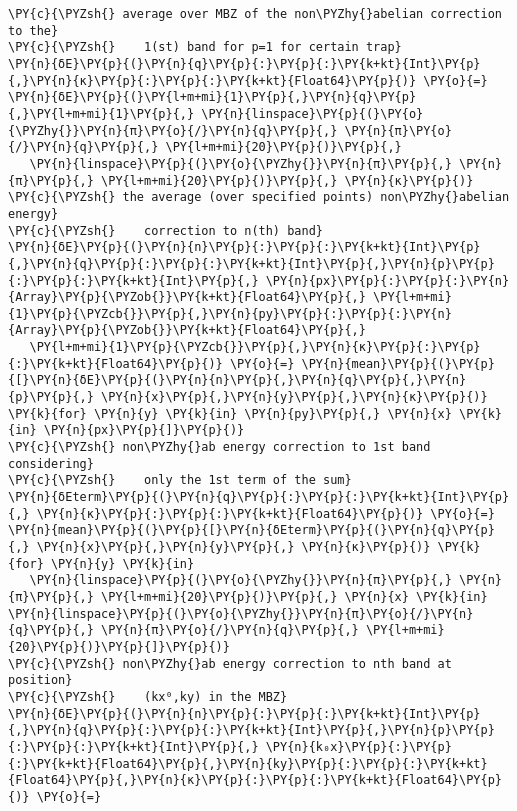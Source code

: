 \begin{Verbatim}[commandchars=\\\{\}]
\PY{c}{\PYZsh{} average over MBZ of the non\PYZhy{}abelian correction to the}
\PY{c}{\PYZsh{}    1(st) band for p=1 for certain trap}
\PY{n}{δE}\PY{p}{(}\PY{n}{q}\PY{p}{:}\PY{p}{:}\PY{k+kt}{Int}\PY{p}{,}\PY{n}{κ}\PY{p}{:}\PY{p}{:}\PY{k+kt}{Float64}\PY{p}{)} \PY{o}{=} \PY{n}{δE}\PY{p}{(}\PY{l+m+mi}{1}\PY{p}{,}\PY{n}{q}\PY{p}{,}\PY{l+m+mi}{1}\PY{p}{,} \PY{n}{linspace}\PY{p}{(}\PY{o}{\PYZhy{}}\PY{n}{π}\PY{o}{/}\PY{n}{q}\PY{p}{,} \PY{n}{π}\PY{o}{/}\PY{n}{q}\PY{p}{,} \PY{l+m+mi}{20}\PY{p}{)}\PY{p}{,}
   \PY{n}{linspace}\PY{p}{(}\PY{o}{\PYZhy{}}\PY{n}{π}\PY{p}{,} \PY{n}{π}\PY{p}{,} \PY{l+m+mi}{20}\PY{p}{)}\PY{p}{,} \PY{n}{κ}\PY{p}{)}
\PY{c}{\PYZsh{} the average (over specified points) non\PYZhy{}abelian energy}
\PY{c}{\PYZsh{}    correction to n(th) band}
\PY{n}{δE}\PY{p}{(}\PY{n}{n}\PY{p}{:}\PY{p}{:}\PY{k+kt}{Int}\PY{p}{,}\PY{n}{q}\PY{p}{:}\PY{p}{:}\PY{k+kt}{Int}\PY{p}{,}\PY{n}{p}\PY{p}{:}\PY{p}{:}\PY{k+kt}{Int}\PY{p}{,} \PY{n}{px}\PY{p}{:}\PY{p}{:}\PY{n}{Array}\PY{p}{\PYZob{}}\PY{k+kt}{Float64}\PY{p}{,} \PY{l+m+mi}{1}\PY{p}{\PYZcb{}}\PY{p}{,}\PY{n}{py}\PY{p}{:}\PY{p}{:}\PY{n}{Array}\PY{p}{\PYZob{}}\PY{k+kt}{Float64}\PY{p}{,}
   \PY{l+m+mi}{1}\PY{p}{\PYZcb{}}\PY{p}{,}\PY{n}{κ}\PY{p}{:}\PY{p}{:}\PY{k+kt}{Float64}\PY{p}{)} \PY{o}{=} \PY{n}{mean}\PY{p}{(}\PY{p}{[}\PY{n}{δE}\PY{p}{(}\PY{n}{n}\PY{p}{,}\PY{n}{q}\PY{p}{,}\PY{n}{p}\PY{p}{,} \PY{n}{x}\PY{p}{,}\PY{n}{y}\PY{p}{,}\PY{n}{κ}\PY{p}{)} \PY{k}{for} \PY{n}{y} \PY{k}{in} \PY{n}{py}\PY{p}{,} \PY{n}{x} \PY{k}{in} \PY{n}{px}\PY{p}{]}\PY{p}{)}
\PY{c}{\PYZsh{} non\PYZhy{}ab energy correction to 1st band considering}
\PY{c}{\PYZsh{}    only the 1st term of the sum}
\PY{n}{δEterm}\PY{p}{(}\PY{n}{q}\PY{p}{:}\PY{p}{:}\PY{k+kt}{Int}\PY{p}{,} \PY{n}{κ}\PY{p}{:}\PY{p}{:}\PY{k+kt}{Float64}\PY{p}{)} \PY{o}{=} \PY{n}{mean}\PY{p}{(}\PY{p}{[}\PY{n}{δEterm}\PY{p}{(}\PY{n}{q}\PY{p}{,} \PY{n}{x}\PY{p}{,}\PY{n}{y}\PY{p}{,} \PY{n}{κ}\PY{p}{)} \PY{k}{for} \PY{n}{y} \PY{k}{in}
   \PY{n}{linspace}\PY{p}{(}\PY{o}{\PYZhy{}}\PY{n}{π}\PY{p}{,} \PY{n}{π}\PY{p}{,} \PY{l+m+mi}{20}\PY{p}{)}\PY{p}{,} \PY{n}{x} \PY{k}{in} \PY{n}{linspace}\PY{p}{(}\PY{o}{\PYZhy{}}\PY{n}{π}\PY{o}{/}\PY{n}{q}\PY{p}{,} \PY{n}{π}\PY{o}{/}\PY{n}{q}\PY{p}{,} \PY{l+m+mi}{20}\PY{p}{)}\PY{p}{]}\PY{p}{)}
\PY{c}{\PYZsh{} non\PYZhy{}ab energy correction to nth band at position}
\PY{c}{\PYZsh{}    (kx⁰,ky) in the MBZ}
\PY{n}{δE}\PY{p}{(}\PY{n}{n}\PY{p}{:}\PY{p}{:}\PY{k+kt}{Int}\PY{p}{,}\PY{n}{q}\PY{p}{:}\PY{p}{:}\PY{k+kt}{Int}\PY{p}{,}\PY{n}{p}\PY{p}{:}\PY{p}{:}\PY{k+kt}{Int}\PY{p}{,} \PY{n}{k₀x}\PY{p}{:}\PY{p}{:}\PY{k+kt}{Float64}\PY{p}{,}\PY{n}{ky}\PY{p}{:}\PY{p}{:}\PY{k+kt}{Float64}\PY{p}{,}\PY{n}{κ}\PY{p}{:}\PY{p}{:}\PY{k+kt}{Float64}\PY{p}{)} \PY{o}{=}

\end{Verbatim}
